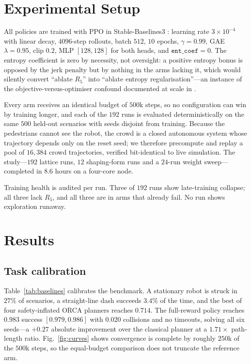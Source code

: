 \documentclass[conference]{IEEEtran}
\begin{document}
\section{Experimental Setup}
All policies are trained with PPO \cite{schulman2017proximal} in
Stable-Baselines3 \cite{raffin2021sb3}: learning rate $3\times10^{-4}$ with
linear decay, $4096$-step rollouts, batch $512$, $10$ epochs, $\gamma=0.99$,
GAE $\lambda=0.95$, clip $0.2$, MLP $[128,128]$ for both heads, and
$\texttt{ent\_coef}=0$. The entropy coefficient is zero by necessity, not
oversight: a positive entropy bonus is opposed by the jerk penalty but by nothing
in the arms lacking it, which would silently convert ``ablate $R_5$'' into
``ablate entropy regularisation''---an instance of the objective-versus-optimiser
confound documented at scale in \cite{andrychowicz2021what}.

Every arm receives an identical budget of $500$k steps, so no configuration can
win by training longer, and each of the $192$ runs is evaluated deterministically
on the same $500$ held-out scenarios with seeds disjoint from training. Because
the pedestrians cannot see the robot, the crowd is a closed autonomous system
whose trajectory depends only on the reset seed; we therefore precompute and
replay a pool of $16{,}384$ crowd trajectories, verified bit-identical to live
simulation. The study---$192$ lattice runs, $12$ shaping-form runs and a $24$-run
weight sweep---completed in $8.6$ hours on a four-core node.

Training health is audited per run. Three of $192$ runs show late-training
collapse; all three lack $R_5$, and all three are in arms that already fail. No
run shows exploration runaway.

\section{Results}
\subsection{Task calibration}
Table~\ref{tab:baselines} calibrates the benchmark. A stationary robot is struck
in $27\%$ of scenarios, a straight-line dash succeeds $3.4\%$ of the time, and
the best of four safety-inflated ORCA planners reaches $0.714$. The full-reward
policy reaches $\mathbf{0.983}$ success $[0.979,0.986]$ with $0.020$ collisions
and no timeouts, solving all six seeds---a $+0.27$ absolute improvement over the
classical planner at a $1.71\times$ path-length ratio. Fig.~\ref{fig:curves} shows convergence is
complete by roughly $250$k of the $500$k steps, so the equal-budget comparison
does not truncate the reference arm.
\end{document}
